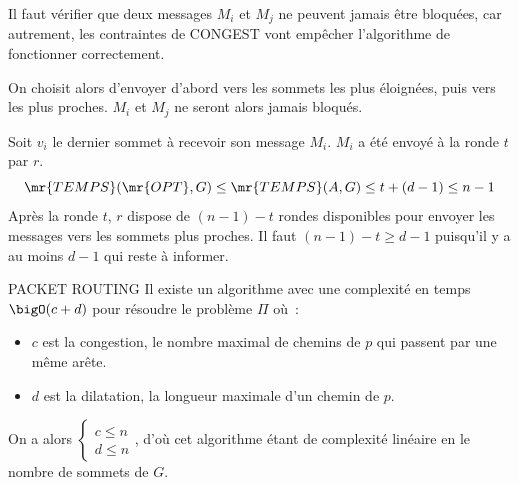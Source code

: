 Il faut vérifier que deux messages $M_i$ et $M_j$ ne peuvent jamais être bloquées, car autrement, les contraintes de CONGEST vont empêcher l'algorithme de fonctionner correctement. 

On choisit alors d'envoyer d'abord vers les sommets les plus éloignées, puis vers les plus proches. $M_i$ et $M_j$ ne seront alors jamais bloqués. \par


Soit $v_i$ le dernier sommet à recevoir son message $M_i$. $M_i$ a été envoyé à la ronde $t$ par $r$. 
$$\mr{TEMPS}(\mr{OPT}, G) \leq \mr{TEMPS}(A,G) \leq t + (d-1) \leq n-1$$
Après la ronde $t$, $r$ dispose de $(n-1) - t$ rondes disponibles pour envoyer les messages vers les sommets plus proches. Il faut $(n-1) - t \geq d-1$ puisqu'il y a au moins $d-1$ qui reste à informer. 


\begin{proposition}{}{PACKET ROUTING}
Il existe un algorithme avec une complexité en temps $\bigO(c + d)$ pour résoudre le problème $\Pi$ où~:
\begin{itemize}
  \item $c$ est la congestion, \ie le nombre maximal de chemins de $p$ qui passent par une même arête.
  \item $d$ est la dilatation, \ie la longueur maximale d'un chemin de $p$. 

\end{itemize}

  On  a alors $\begin{cases*}c \leq n \\ d \leq n \end{cases*}$, d'où cet algorithme étant de complexité linéaire en le nombre de sommets de $G$.

\end{proposition}
